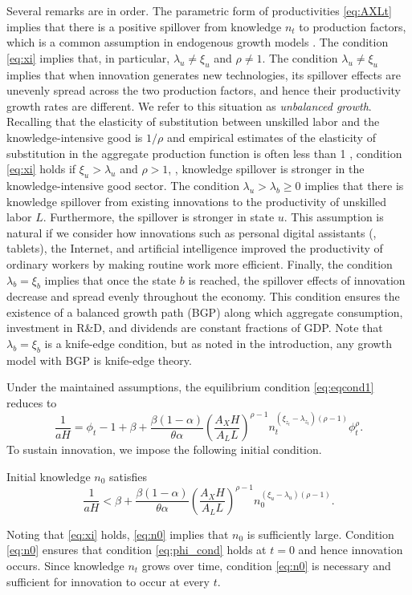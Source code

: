 \documentclass[a4paper,12pt]{article}
\numberwithin{equation}{section}
\theoremstyle{plain}
\begin{document}
Several remarks are in order. The parametric form of productivities \eqref{eq:AXLt} implies that there is a positive spillover from knowledge $n_t$ to production factors, which is a common assumption in endogenous growth models \citep{Frankel1962,Romer1986}. The condition \eqref{eq:xi} implies that, in particular, $\lambda_u\neq \xi_u$ and $\rho\neq 1$. The condition $\lambda_u\neq \xi_u$ implies that when innovation generates new technologies, its spillover effects are unevenly spread across the two production factors, and hence their productivity growth rates are different. We refer to this situation as \emph{unbalanced growth}. Recalling that the elasticity of substitution between unskilled labor and the knowledge-intensive good is $1/\rho$ and empirical estimates of the elasticity of substitution in the aggregate production function is often less than 1 \citep{OberfieldRaval2021,GechertHavranekIrsovaKolcunova2022}, condition \eqref{eq:xi} holds if $\xi_u>\lambda_u$ and $\rho>1$, \ie, knowledge spillover is stronger in the knowledge-intensive good sector. The condition $\lambda_u>\lambda_b\ge 0$ implies that there is knowledge spillover from existing innovations to the productivity of unskilled labor $L$. Furthermore, the spillover is stronger in state $u$. This assumption is natural if we consider how innovations such as personal digital assistants (\ie, tablets), the Internet, and artificial intelligence improved the productivity of ordinary workers by making routine work more efficient. Finally, the condition $\lambda_b=\xi_b$ implies that once the state $b$ is reached, the spillover effects of innovation decrease and spread evenly throughout the economy. This condition ensures the existence of a balanced growth path (BGP) along which aggregate consumption, investment in R\&D, and dividends are constant fractions of GDP. Note that $\lambda_b=\xi_b$ is a knife-edge condition, but as noted in the introduction, any growth model with BGP is knife-edge theory.

Under the maintained assumptions, the equilibrium condition \eqref{eq:eqcond1} reduces to
\begin{equation}
    \frac{1}{aH}=\phi_t-1+\beta+\frac{\beta(1-\alpha)}{\theta\alpha}\left(\frac{A_XH}{A_LL}\right)^{\rho-1}n_t^{(\xi_{z_t}-\lambda_{z_t})(\rho-1)}\phi_t^\rho. \label{eq:eqcond2}
\end{equation}
To sustain innovation, we impose the following initial condition.

\begin{asmp}\label{asmp:n0}
Initial knowledge $n_0$ satisfies
\begin{equation}
    \frac{1}{aH}<\beta+\frac{\beta(1-\alpha)}{\theta\alpha}\left(\frac{A_XH}{A_LL}\right)^{\rho-1}n_0^{(\xi_u-\lambda_u)(\rho-1)}. \label{eq:n0}
\end{equation}
\end{asmp}
Noting that \eqref{eq:xi} holds, \eqref{eq:n0} implies that $n_0$ is sufficiently large. Condition \eqref{eq:n0} ensures that condition \eqref{eq:phi_cond} holds at $t=0$ and hence innovation occurs. Since knowledge $n_t$ grows over time, condition \eqref{eq:n0} is necessary and sufficient for innovation to occur at every $t$.
\end{document}
